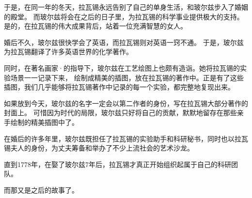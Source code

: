 \documentclass[a4paper]{article}
\begin{document}
于是，在同一年的冬天，拉瓦锡永远告别了自己的单身生活，和玻尔兹步入了婚姻的殿堂。
而玻尔兹将会在之后的日子里，为拉瓦锡的科学事业提供极大的支持。是的，在拉瓦锡的伟大成果背后，站着一位充满智慧的女人。

婚后不久，玻尔兹很快学会了英语，而拉瓦锡则对英语一窍不通。
于是，玻尔兹为拉瓦锡翻译了许多英语世界的化学著作。

同时，在著名画家\os{}{-}·的指导下，玻尔兹在工艺绘图上也颇有造诣。她将拉瓦锡的实验场景一一记录下来，
绘制成精美的插图，放在拉瓦锡的著作中。正是有了这些插图，我们几乎能够将拉瓦锡著作中记录的每一个实验，都完整地复现出来。

如果放到今天，玻尔兹的名字一定会以第二作者的身份，写在拉瓦锡大部分著作的封面上。
可惜因为时代的局限，玻尔兹只好将自己的贡献，默默地留存在那些亲手绘制的精美插图中了。

在婚后的许多年里，玻尔兹既担任了拉瓦锡的实验助手和科研秘书，同时也以拉瓦锡夫人的身份，为丈夫筹备和举办了不少上流社会的艺术沙龙。

直到1778年，在娶了玻尔兹7年后，拉瓦锡才真正开始组织起属于自己的科研团队。

而那又是之后的故事了。

\end{document}
